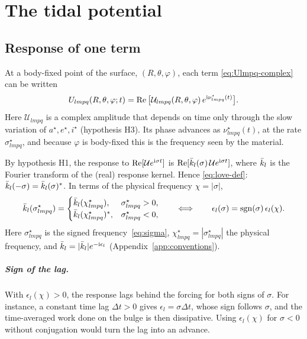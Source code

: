 \chapter{The tidal potential}\label{ch:tidal}

\section{Response of one term}
At a body-fixed point of the surface, $(R,\theta,\varphi)$, each term \eqref{eq:Ulmpq-complex} can be written
\[
  U_{lmpq}(R,\theta,\varphi;t)=\operatorname{Re}\big[\mathcal U_{lmpq}(R,\theta,\varphi)\,e^{\mathrm{i}\nu^\star_{lmpq}(t)}\big].
\]
Here $\mathcal U_{lmpq}$ is a complex amplitude that depends on time only through the slow variation of $a^\star,e^\star,i^\star$ (hypothesis H3). Its phase advances as $\nu^\star_{lmpq}(t)$, at the rate $\sigma^\star_{lmpq}$, and because $\varphi$ is body-fixed this is the frequency seen by the material.

By hypothesis H1, the response to $\operatorname{Re}[\mathcal Ue^{\mathrm{i}\sigma t}]$ is $\operatorname{Re}[\bar k_l(\sigma)\,\mathcal Ue^{\mathrm{i}\sigma t}]$, where $\bar k_l$ is the Fourier transform of the (real) response kernel. Hence \eqref{eq:love-def}: $\bar k_l(-\sigma)=\bar k_l(\sigma)^*$. In terms of the physical frequency $\chi=|\sigma|$,
\begin{equation}
  \bar k_l(\sigma^\star_{lmpq})=\begin{cases}\bar k_l(\chi^\star_{lmpq}),&\sigma^\star_{lmpq}>0,\\ \bar k_l(\chi^\star_{lmpq})^*,&\sigma^\star_{lmpq}<0,\end{cases}\qquad\Longleftrightarrow\qquad \epsilon_l(\sigma)=\operatorname{sgn}(\sigma)\,\epsilon_l(\chi). \label{eq:love-chi}
\end{equation}
Here $\sigma^\star_{lmpq}$ is the signed frequency~\eqref{eq:sigma}, $\chi^\star_{lmpq}=|\sigma^\star_{lmpq}|$ the physical frequency, and $\bar k_l=|\bar k_l|e^{-\mathrm{i}\epsilon_l}$ (Appendix~\ref{app:conventions}).

\paragraph{Sign of the lag.} With $\epsilon_l(\chi)>0$, the response lags behind the forcing for both signs of $\sigma$. For instance, a constant time lag $\Delta t>0$ gives $\epsilon_l=\sigma\Delta t$, whose sign follows $\sigma$, and the time-averaged work done on the bulge is then dissipative. Using $\epsilon_l(\chi)$ for $\sigma<0$ without conjugation would turn the lag into an advance.

